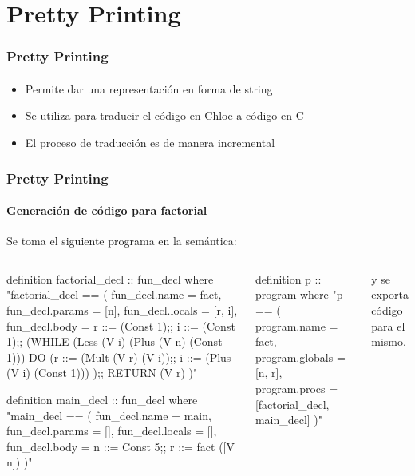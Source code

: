 \section{Pretty Printing}

\begin{frame}
\frametitle{Pretty Printing}
\framesubtitle{}

\begin{itemize}
\item{Permite dar una representación en forma de string}
\item{Se utiliza para traducir el código en Chloe a código en C}
\item{El proceso de traducción es de manera incremental}
\end{itemize}

\end{frame}

\begin{frame}[fragile]
\frametitle{Pretty Printing}
\framesubtitle{Generación de código para factorial}
\Fontvi

Se toma el siguiente programa en la semántica:

\begin{columns}[t]
\begin{semiverbatim}
definition factorial_decl :: fun_decl
  where "factorial_decl ==
    ( fun_decl.name = fact,
      fun_decl.params = [n],
      fun_decl.locals = [r, i],
      fun_decl.body =
        r ::= (Const 1);;
        i ::= (Const 1);;
        (WHILE (Less (V i) (Plus (V n) (Const 1))) DO
          (r ::= (Mult (V r) (V i));;
          i ::= (Plus (V i) (Const 1)))
        );;
        RETURN (V r)
    )"

definition main_decl :: fun_decl
  where "main_decl ==
    ( fun_decl.name = main,
      fun_decl.params = [],
      fun_decl.locals = [],
      fun_decl.body =
        n ::= Const 5;;
        r ::= fact ([V n])
    )"
\end{semiverbatim}
\begin{semiverbatim}
definition p :: program
  where "p ==
    ( program.name = fact,
      program.globals = [n, r],
      program.procs = [factorial_decl, main_decl]
    )"
\end{semiverbatim}

y se exporta código para el mismo.
\end{columns}


\end{frame}



